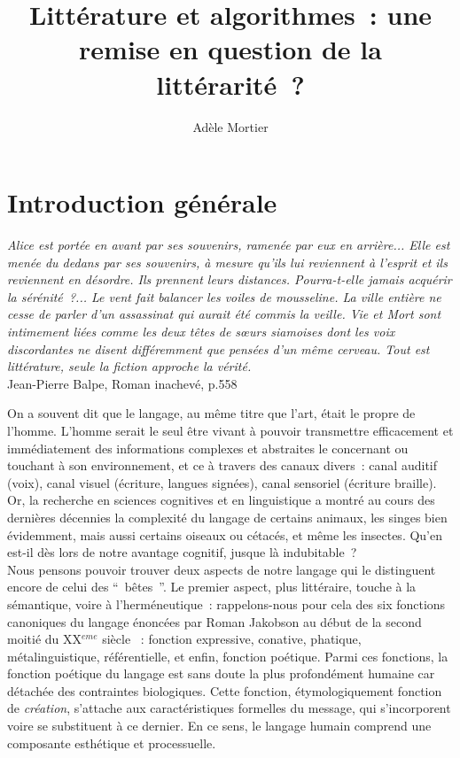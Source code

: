\documentclass{article}
\title{Littérature et algorithmes~: une remise en question de la littérarité~?}
\author{Adèle Mortier}
\begin{document}
	\nocite{*}
	\maketitle
	\tableofcontents
	\newpage
	\section*{Introduction générale}
	\begin{center}
		\begin{minipage}{.8\textwidth}
			\textit{Alice est portée en avant par ses souvenirs, ramenée par eux en arrière... Elle est menée du dedans par ses souvenirs, à mesure qu'ils lui reviennent à l'esprit et ils reviennent en désordre. Ils prennent leurs distances. Pourra-t-elle jamais acquérir la sérénité~?... Le vent fait balancer les voiles de mousseline. La ville entière ne cesse de parler d'un assassinat qui aurait été commis la veille. Vie et Mort sont intimement liées comme les deux têtes de sœurs siamoises dont les voix discordantes ne disent différemment que pensées d'un même cerveau. Tout est littérature, seule la fiction approche la vérité.}\\ Jean-Pierre Balpe, Roman inachevé, p.558
		\end{minipage}
	\end{center}
	
		On a souvent dit que le langage, au même titre que l'art, était le propre de l'homme. L'homme serait le seul être vivant à pouvoir transmettre efficacement et immédiatement des informations complexes et abstraites le concernant ou touchant à son environnement, et ce à travers des canaux divers~: canal auditif (voix), canal visuel (écriture, langues signées), canal sensoriel (écriture braille). Or, la recherche en sciences cognitives et  en linguistique a montré au cours des dernières décennies la complexité du langage de certains animaux, les singes bien évidemment\cite{schlenker2014}, mais aussi certains oiseaux ou cétacés\cite{dehaene2017}, et même les insectes. Qu'en est-il dès lors de notre avantage cognitif, jusque là indubitable~?\\
		
		Nous pensons pouvoir trouver deux aspects de notre langage qui le distinguent encore de celui des `` bêtes ''. Le premier aspect, plus littéraire, touche à la sémantique, voire à l'herméneutique~: rappelons-nous pour cela des six fonctions canoniques du langage énoncées par Roman Jakobson au début de la second moitié du XX$^{eme}$ siècle \cite{jakobson1960}~: fonction expressive, conative, phatique, métalinguistique, référentielle, et enfin, fonction poétique. Parmi ces fonctions, la fonction poétique du langage est sans doute la plus profondément humaine car détachée des contraintes biologiques. Cette fonction, étymologiquement fonction de \textit{création}, s'attache aux caractéristiques formelles du message, qui s'incorporent voire se substituent à ce dernier. En ce sens, le langage humain comprend une composante esthétique et processuelle.\\
		
\end{document}
